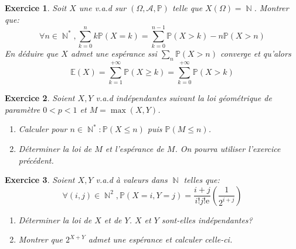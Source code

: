 \documentclass[12pt,a4paper]{article}
\DeclareMathOperator{\N}{\mathbb{N}}
\newtheorem{Exo}{Exercice}
\newcommand{\tribu}{\mathcal{A}}
\renewcommand{\Pr}{\mathbb{P}}
\begin{document}
\begin{Exo}
		Soit $X$ une v.a.d sur 	$\left(\Omega,\tribu,\Pr\right)$ telle que $X(\Omega)=\N$.
Montrer que: $$\forall n\in\N^*,\sum_{k=0}^nk\Pr(X=k)=\sum_{k=0}^{n-1}\Pr(X>k)-n\Pr(X>n)$$
 En déduire que  $X$ admet une espérance ssi $\sum_n\Pr(X>n)$ converge et qu'alors $$\mathbb{E}(X)=\sum_{k=1}^{+\infty}\Pr(X\geqslant k)=\sum_{k=0}^{+\infty}\Pr(X>k)$$
\end{Exo}

\begin{Exo}
	Soient $X,Y$ v.a.d indépendantes suivant la loi géométrique de paramètre $0<p<1$ et $M=\max(X,Y)$.
\begin{enumerate}
	\item
	Calculer pour $n\in\N^*:\Pr(X\leqslant n)$ puis $\Pr(M\leqslant n)$.
	\item
	Déterminer la loi de $M$ et l'espérance de $M$. On pourra utiliser l'exercice précédent.
\end{enumerate}
\end{Exo}






\begin{Exo}
	Soient $X,Y$ v.a.d à valeurs dans $\N$ telles que:
$$\forall(i,j)\in\N^2,\Pr(X=i,Y=j)=\frac{i+j}{i!j!\mathrm{e}}\left(\frac{1}{2^{i+j}}\right)$$
\begin{enumerate}
	\item
	Déterminer la loi de $X$ et de $Y$. $X$ et $Y$ sont-elles indépendantes?
	\item
	Montrer que $2^{X+Y}$ admet une espérance et calculer celle-ci.
\end{enumerate}
\end{Exo}
\end{document}
